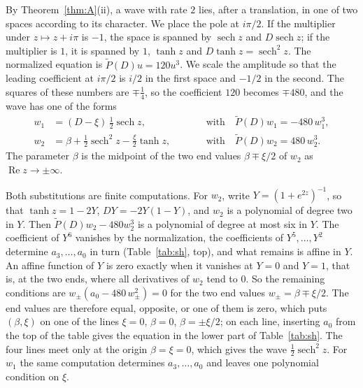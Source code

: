 \documentclass[11pt]{article}
\theoremstyle{definition}
\theoremstyle{remark}
\numberwithin{equation}{section}
\DeclareMathOperator{\sech}{sech}
\begin{document}
By Theorem~\ref{thm:A}(ii), a wave with rate \(2\) lies, after a
translation, in one of two spaces according to its character. We place
the pole at \(i\pi/2\). If the multiplier under \(z\mapsto z+i\pi\) is
\(-1\), the space is spanned by \(\sech z\) and \(D\sech z\); if the
multiplier is \(1\), it is spanned by \(1\), \(\tanh z\) and
\(D\tanh z=\sech^2z\). The normalized equation
is \(\widetilde P(D)u=120u^3\). We scale the amplitude so that the
leading coefficient at \(i\pi/2\) is \(i/2\) in the first space and
\(-1/2\) in the second. The squares of these numbers are
\(\mp\tfrac14\), so the coefficient \(120\) becomes \(\mp480\), and the
wave has one of the forms
\begin{equation}\label{eq:sh-spaces}
\begin{aligned}
 w_1&=(D-\xi)\,\tfrac12\sech z, &\qquad
 &\text{with}\quad\widetilde P(D)w_1=-480\,w_1^3,\\
 w_2&=\beta+\tfrac12\sech^2z-\tfrac{\xi}{2}\tanh z, &\qquad
 &\text{with}\quad\widetilde P(D)w_2=480\,w_2^3 .
\end{aligned}
\end{equation}
The parameter \(\beta\) is the midpoint of the two end values
\(\beta\mp\xi/2\) of \(w_2\) as \(\operatorname{Re}z\to\pm\infty\).

Both substitutions are finite computations. For \(w_2\), write
\(Y=(1+e^{2z})^{-1}\), so that \(\tanh z=1-2Y\), \(DY=-2Y(1-Y)\), and
\(w_2\) is a polynomial of degree two in \(Y\). Then
\(\widetilde P(D)w_2-480w_2^3\) is a polynomial of degree at most six
in \(Y\). The coefficient of \(Y^6\) vanishes by the normalization, the
coefficients of \(Y^5,\dots,Y^2\) determine \(a_3,\dots,a_0\) in turn
(Table~\ref{tab:sh}, top), and what remains is affine in \(Y\). An
affine function of \(Y\) is zero exactly when it vanishes at \(Y=0\)
and \(Y=1\), that is, at the two ends, where all derivatives of \(w_2\)
tend to \(0\). So the remaining conditions are
\(w_\pm(a_0-480\,w_\pm^2)=0\) for the two end values
\(w_\pm=\beta\mp\xi/2\). The end values are therefore equal, opposite,
or one of them is zero, which puts \((\beta,\xi)\) on one of the lines
\(\xi=0\), \(\beta=0\), \(\beta=\pm\xi/2\); on each line, inserting
\(a_0\) from the top of the table gives the equation in the lower part
of Table~\ref{tab:sh}. The four lines meet only at the origin
\(\beta=\xi=0\), which gives the wave \(\tfrac12\sech^2z\). For \(w_1\)
the same computation determines \(a_3,\dots,a_0\) and leaves one
polynomial condition on \(\xi\).
\end{document}
